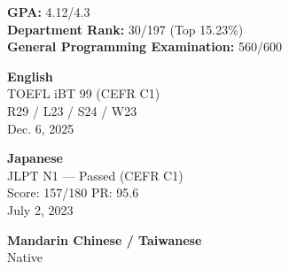 
\textbf{GPA:} 4.12/4.3\\
\textbf{Department Rank:} 30/197 (Top 15.23\%)\\
\textbf{General Programming Examination:} 560/600






\textbf{English}\\
TOEFL iBT 99 (CEFR C1)\\
R29 / L23 / S24 / W23\\
Dec. 6, 2025

\smallskip
\textbf{Japanese}\\
JLPT N1 --- Passed (CEFR C1)\\
Score: 157/180 \textbar{} PR: 95.6\\
July 2, 2023

\smallskip
\textbf{Mandarin Chinese / Taiwanese}\\
Native
